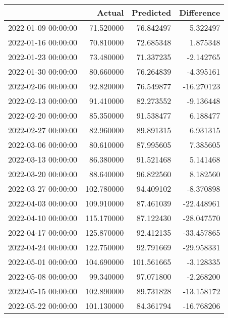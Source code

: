 \begin{tabular}{lrrr}
\toprule
 & Actual & Predicted & Difference \\
\midrule
2022-01-09 00:00:00 & 71.520000 & 76.842497 & 5.322497 \\
2022-01-16 00:00:00 & 70.810000 & 72.685348 & 1.875348 \\
2022-01-23 00:00:00 & 73.480000 & 71.337235 & -2.142765 \\
2022-01-30 00:00:00 & 80.660000 & 76.264839 & -4.395161 \\
2022-02-06 00:00:00 & 92.820000 & 76.549877 & -16.270123 \\
2022-02-13 00:00:00 & 91.410000 & 82.273552 & -9.136448 \\
2022-02-20 00:00:00 & 85.350000 & 91.538477 & 6.188477 \\
2022-02-27 00:00:00 & 82.960000 & 89.891315 & 6.931315 \\
2022-03-06 00:00:00 & 80.610000 & 87.995605 & 7.385605 \\
2022-03-13 00:00:00 & 86.380000 & 91.521468 & 5.141468 \\
2022-03-20 00:00:00 & 88.640000 & 96.822560 & 8.182560 \\
2022-03-27 00:00:00 & 102.780000 & 94.409102 & -8.370898 \\
2022-04-03 00:00:00 & 109.910000 & 87.461039 & -22.448961 \\
2022-04-10 00:00:00 & 115.170000 & 87.122430 & -28.047570 \\
2022-04-17 00:00:00 & 125.870000 & 92.412135 & -33.457865 \\
2022-04-24 00:00:00 & 122.750000 & 92.791669 & -29.958331 \\
2022-05-01 00:00:00 & 104.690000 & 101.561665 & -3.128335 \\
2022-05-08 00:00:00 & 99.340000 & 97.071800 & -2.268200 \\
2022-05-15 00:00:00 & 102.890000 & 89.731828 & -13.158172 \\
2022-05-22 00:00:00 & 101.130000 & 84.361794 & -16.768206 \\
\bottomrule
\end{tabular}
